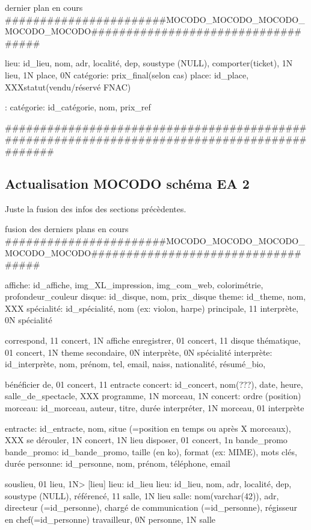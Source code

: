 \documentclass[12pt,a4paper]{article}
\begin{document}
{dernier plan en cours
#######################MOCODO_MOCODO_MOCODO_MOCODO_MOCODO###################################


lieu: id_lieu, nom, adr, localité, dep, soustype (NULL),
comporter(ticket), 1N lieu, 1N place, 0N catégorie: prix_final(selon cas)
place: id_place, XXXstatut(vendu/réservé FNAC)

:
catégorie: id_catégorie, nom, prix_ref

#############################################################################################





\subsection{Actualisation MOCODO schéma EA 2}
Juste la fusion des infos des sections précèdentes.

fusion des derniers plans en cours
#######################MOCODO_MOCODO_MOCODO_MOCODO_MOCODO###################################

affiche: id_affiche, img_XL_impression, img_com_web, colorimétrie, profondeur_couleur
disque: id_disque, nom, prix_disque
theme: id_theme, nom, XXX
spécialité: id_spécialité, nom (ex: violon, harpe)
principale, 11 interprète, 0N spécialité

correspond, 11 concert, 1N affiche
enregistrer, 01 concert, 11 disque
thématique, 01 concert, 1N theme
secondaire, 0N interprète, 0N spécialité
interprète: id_interprète, nom, prénom, tel, email, naiss, nationalité, résumé_bio,

bénéficier de, 01 concert, 11 entracte
concert: id_concert, nom(???), date, heure, salle_de_spectacle, XXX
programme, 1N morceau, 1N concert: ordre (position)
morceau: id_morceau, auteur, titre, durée
interpréter, 1N morceau, 01 interprète

entracte: id_entracte, nom, situe (=position en temps ou après X morceaux), XXX
se dérouler, 1N concert, 1N lieu
disposer, 01 concert, 1n bande_promo
bande_promo: id_bande_promo, taille (en ko), format (ex: MIME), mots clés, durée
personne: id_personne, nom, prénom, téléphone, email

souslieu, 01 lieu,   1N> [lieu] lieu: id_lieu
lieu: id_lieu, nom, adr, localité, dep, soustype (NULL),
référencé, 11 salle, 1N lieu
salle: nom(varchar(42)), adr, directeur (=id_personne), chargé de communication (=id_personne), régisseur en chef(=id_personne)
travailleur, 0N personne, 1N salle

}
\end{document}
